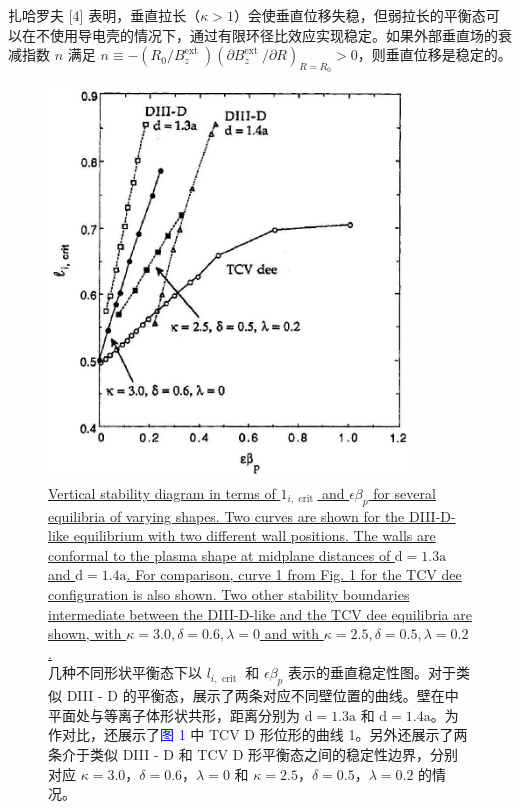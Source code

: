 \documentclass[utf8]{ctexart}
\begin{document}
\begin{sloppypar}
{扎哈罗夫 \textcolor{green!50!black}{[4]} 表明，垂直拉长（$\kappa>1$）会使垂直位移失稳，但弱拉长的平衡态可以在不使用导电壳的情况下，通过有限环径比效应实现稳定。如果外部垂直场的衰减指数 $n$ 满足 $n \equiv-\left(R_{0} / B_{z}^{\text {ext }}\right)\left(\partial B_{z}^{\text {ext }} / \partial R\right)_{R=R_{0}}>0$，则垂直位移是稳定的。 }
  \begin{figure}[H]
  	\centering
  	\includegraphics[max width=0.85\textwidth,max height=0.3\textheight]{2025_01_10_a0135324997886412d98g-5}
 \caption{\uline{Vertical stability diagram in terms of $1_{i, \text { crit }}$ and $\epsilon \beta_{p}$ for several equilibria of varying shapes. Two curves are shown for the DIII-D-like equilibrium with two different wall positions. The walls are conformal to the plasma shape at midplane distances of $\mathrm{d}=1.3 \mathrm{a}$ and $\mathrm{d}=1.4 \mathrm{a}$. For comparison, curve 1 from Fig. 1 for the TCV dee configuration is also shown. Two other stability boundaries intermediate between the DIII-D-like and the TCV dee equilibria are shown, with $\kappa=3.0, \delta=0.6, \lambda=0$ and with $\kappa=2.5, \delta=0.5, \lambda=0.2$.}\\几种不同形状平衡态下以 $l_{i, \text { crit }}$ 和 $\epsilon \beta_{p}$ 表示的垂直稳定性图。对于类似 DIII - D 的平衡态，展示了两条对应不同壁位置的曲线。壁在中平面处与等离子体形状共形，距离分别为 $\mathrm{d}=1.3 \mathrm{a}$ 和 $\mathrm{d}=1.4 \mathrm{a}$。为作对比，还展示了\textcolor{blue}{图 1} 中 TCV D 形位形的曲线 1。另外还展示了两条介于类似 DIII - D 和 TCV D 形平衡态之间的稳定性边界，分别对应 $\kappa=3.0$，$\delta=0.6$，$\lambda=0$ 和 $\kappa=2.5$，$\delta=0.5$，$\lambda=0.2$ 的情况。 }
  	\label{fig3.}
  \end{figure}
  

\end{sloppypar}
\end{document}
